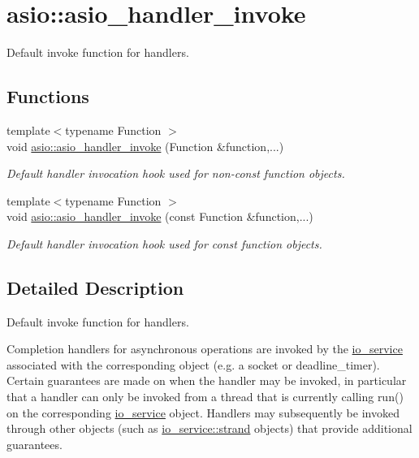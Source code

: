 \hypertarget{group__asio__handler__invoke}{}\section{asio\+:\+:asio\+\_\+handler\+\_\+invoke}
\label{group__asio__handler__invoke}


Default invoke function for handlers.  


\subsection*{Functions}
\begin{DoxyCompactItemize}
\item 
{\footnotesize template$<$typename Function $>$ }\\void \hyperlink{group__asio__handler__invoke_ga91c8e702816572ffb691ca3f60a27871}{asio\+::asio\+\_\+handler\+\_\+invoke} (Function \&function,...)
\begin{DoxyCompactList}\small\item\em Default handler invocation hook used for non-\/const function objects. \end{DoxyCompactList}\item 
{\footnotesize template$<$typename Function $>$ }\\void \hyperlink{group__asio__handler__invoke_gabe759a0b25886ffc0b10ecd98bb69edd}{asio\+::asio\+\_\+handler\+\_\+invoke} (const Function \&function,...)
\begin{DoxyCompactList}\small\item\em Default handler invocation hook used for const function objects. \end{DoxyCompactList}\end{DoxyCompactItemize}


\subsection{Detailed Description}
Default invoke function for handlers. 

Completion handlers for asynchronous operations are invoked by the \hyperlink{classasio_1_1io__service}{io\+\_\+service} associated with the corresponding object (e.\+g. a socket or deadline\+\_\+timer). Certain guarantees are made on when the handler may be invoked, in particular that a handler can only be invoked from a thread that is currently calling {\ttfamily run()} on the corresponding \hyperlink{classasio_1_1io__service}{io\+\_\+service} object. Handlers may subsequently be invoked through other objects (such as \hyperlink{classasio_1_1io__service_1_1strand}{io\+\_\+service\+::strand} objects) that provide additional guarantees.

